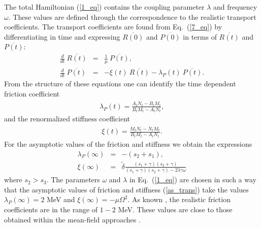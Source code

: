 \documentclass[preprint,review,12pt]{elsarticle}
\begin{document}
  The total Hamiltonian (\ref{1_eq}) contains the coupling parameter $\lambda$ and frequency $\omega$. These values
  are defined through the correspondence to the realistic transport coefficients.
  The transport coefficients are found from Eq.~(\ref{7_eq}) by differentiating in time and expressing $\overline{R(0)}$ and $\overline{P(0)}$  in terms of $\overline{R(t)}$ and $\overline{P(t)}$:
  \begin{eqnarray}
  \frac{d}{dt}\ \overline{R(t)}&=&\frac{1}{\mu}\ \overline{P(t)},\nonumber\\
  \frac{d}{dt}\ \overline{P(t)}&=&-\xi (t)\ \overline{R(t)}-\lambda_P(t)\ \overline{P(t)}.
  \label{14_eq}
  \end{eqnarray}
  From the structure of these equations one can identify the time dependent friction coefficient
  \begin{eqnarray}
  \lambda_P(t)=\frac{A_t{\dot N}_t - B_t{\dot M}_t }
  {B_tM_t - A_tN_t},
  \label{15b_eq}
  \end{eqnarray}
  and the renormalized stiffness coefficient
  \begin{eqnarray}
  \xi (t) = \frac{{\dot M}_t N_t - {\dot N}_tM_t}
  {B_tM_t - A_tN_t}.
  \label{15d_eq}
  \end{eqnarray}
  For the asymptotic values of the friction and stiffness
  we obtain the expressions
  \begin{eqnarray}
  \nonumber
  \lambda_P(\infty)&=&-(s_2+s_1),\\
  \xi (\infty)&=&\tilde\delta\frac{(s_1+\gamma)(s_2+\gamma)}{(s_1+\gamma)(s_2+\gamma)-
  2\lambda\gamma\omega}
  \label{as_trans}
  \end{eqnarray}
  where $s_2>s_3$. The parameters $\omega$ and $\lambda$ in Eq.~(\ref{1_eq}) are chosen in such a way that the asymptotic values of friction and stiffness (\ref{as_trans}) take the values $\lambda_P(\infty)=2$ MeV and $\xi (\infty)=-\mu \Omega^2$. As known \cite{PRC1,PRC2}, the realistic friction coefficients are in the range of $1-2$ MeV.
  These values are close to those obtained within the mean-field approaches \cite{Wash,Ayik1}.
\end{document}
